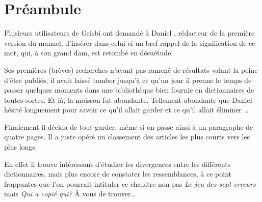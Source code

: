 

\chapter{Préambule\label{preamble}}


Plusieurs utilisateurs de \gls{Grisbi} ont demandé à Daniel , rédacteur de la première version du manuel, d'insérer dans celui-ci un bref rappel de la signification de ce mot, qui, à son grand dam, est retombé en désuétude.

Ses premières (brèves) recherches n'ayant pas ramené de résultats valant la peine d'être publiés, il avait laissé tomber jusqu'à ce qu'un jour il prenne le temps de passer quelques moments dans une bibliothèque bien fournie en dictionnaires de toutes sortes. Et là, la moisson fut abondante. Tellement abondante que Daniel  hésité longuement pour savoir ce qu'il allait garder et ce qu'il allait éliminer  \ldots 

Finalement il décida de tout garder, même si on passe ainsi à un paragraphe de quatre pages. Il a juste opéré un classement des articles les plus courts vers les plus longs.

En effet il trouve intéressant d'étudier les divergences entre les différents dictionnaires, mais plus encore de constater les ressemblances, à ce point frappantes que l'on pourrait intituler ce chapitre non pas \emph{Le jeu des sept erreurs} mais \emph{Qui a copié qui?} À vous de trouver\dots{}

